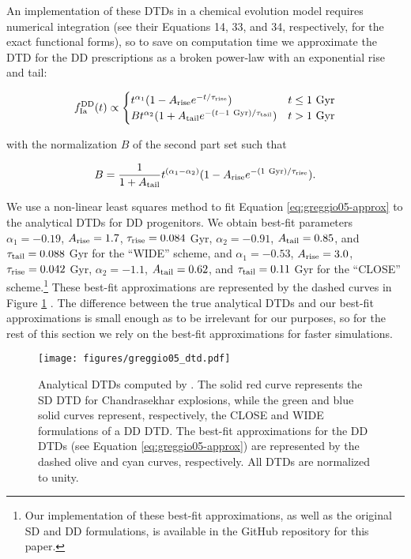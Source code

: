 \documentclass[twocolumn]{aastex631}
\begin{document}
An implementation of these DTDs in a chemical evolution model requires numerical integration (see their Equations 14, 33, and 34, respectively, for the exact functional forms), so to save on computation time we approximate the DTD for the DD prescriptions as a broken power-law with an exponential rise and tail:

\begin{equation}
    f_{\rm{Ia}}^{\rm{DD}}(t) \propto
    \begin{cases}
        t^{\alpha_1} (1 - A_{\rm{rise}} e^{-t/\tau_{\rm{rise}}}) & t \le 1~\rm{Gyr} \\
        B t^{\alpha_2} (1 + A_{\rm{tail}} e^{-(t - 1~\rm{Gyr})/\tau_{\rm{tail}}}) & t > 1~\rm{Gyr}
    \end{cases}
    \label{eq:greggio05-approx}
\end{equation}

\noindent with the normalization $B$ of the second part set such that

\begin{equation}
    B = \frac{1}{1 + A_{\rm{tail}}} t^{(\alpha_1-\alpha_2)} (1 - A_{\rm{rise}} e^{-(1~\rm{Gyr})/\tau_{\rm{rise}}}).
\end{equation}

\noindent We use a non-linear least squares method to fit Equation \ref{eq:greggio05-approx} to the analytical DTDs for DD progenitors. We obtain best-fit parameters $\alpha_1=-0.19$, $A_{\rm{rise}}=1.7$, $\tau_{\rm{rise}}=0.084$ Gyr, $\alpha_2=-0.91$, $A_{\rm{tail}}=0.85$, and $\tau_{\rm{tail}}=0.088$ Gyr for the ``WIDE'' scheme, and $\alpha_1=-0.53$, $A_{\rm{rise}}=3.0$, $\tau_{\rm{rise}}=0.042$ Gyr, $\alpha_2=-1.1$, $A_{\rm{tail}}=0.62$, and $\tau_{\rm{tail}}=0.11$ Gyr for the ``CLOSE'' scheme.\footnote{
Our implementation of these best-fit approximations, as well as the original SD and DD formulations, is available in the GitHub repository for this paper.
} These best-fit approximations are represented by the dashed curves in Figure \ref{fig:greggio05-dtd} \citep[see also Figure 8 in][]{Greggio2005-AnalyticalRates}. The difference between the true analytical DTDs and our best-fit approximations is small enough as to be irrelevant for our purposes, so for the rest of this section we rely on the best-fit approximations for faster simulations.

\begin{figure}
    \centering
    \texttt{[image: figures/greggio05\_dtd.pdf]}
    \caption{Analytical DTDs computed by \citet{Greggio2005-AnalyticalRates}. The solid red curve represents the SD DTD for Chandrasekhar explosions, while the green and blue solid curves represent, respectively, the CLOSE and WIDE formulations of a DD DTD. The best-fit approximations for the DD DTDs (see Equation \ref{eq:greggio05-approx}) are represented by the dashed olive and cyan curves, respectively. All DTDs are normalized to unity.}
    \label{fig:greggio05-dtd}
\end{figure}
\end{document}
